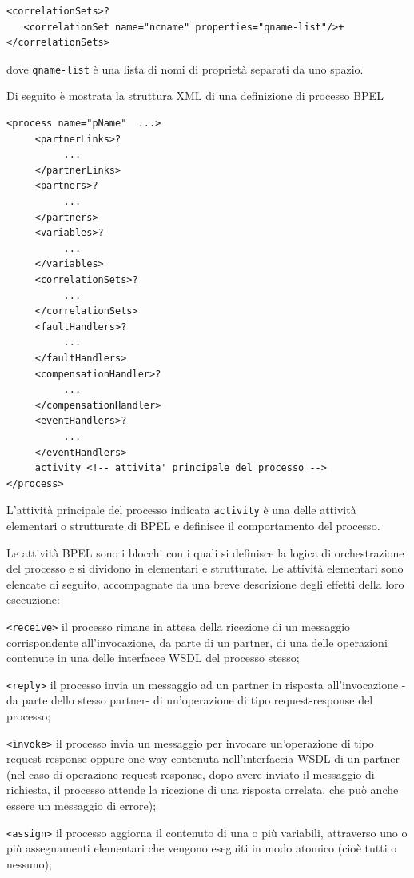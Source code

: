 \begin{verbatim}
<correlationSets>?
   <correlationSet name="ncname" properties="qname-list"/>+
</correlationSets>
\end{verbatim}

dove \texttt{qname-list} è una lista di nomi di proprietà separati da uno
spazio.

Di seguito è mostrata la struttura XML di una definizione di processo BPEL
\begin{verbatim}
<process name="pName"  ...>
     <partnerLinks>?
          ...
     </partnerLinks>
     <partners>?
          ...
     </partners>
     <variables>?
          ...
     </variables>
     <correlationSets>?
          ...
     </correlationSets>
     <faultHandlers>?
          ...
     </faultHandlers>
     <compensationHandler>?
          ...
     </compensationHandler>
     <eventHandlers>?
          ...
     </eventHandlers>
     activity <!-- attivita' principale del processo -->
</process>
\end{verbatim}
L'attività principale del processo indicata \texttt{activity} è una delle
attività elementari o strutturate di BPEL e definisce il comportamento del processo.

Le attività BPEL sono i blocchi con i quali si definisce la logica di
orchestrazione del processo e si dividono in elementari e strutturate. Le
attività elementari sono elencate di seguito, accompagnate da una breve
descrizione degli effetti della loro esecuzione:

\texttt{<receive>} il processo rimane in attesa della ricezione di un messaggio
     corrispondente all'invocazione, da parte di un partner, di una delle
     operazioni contenute in una delle interfacce WSDL del processo stesso;

\texttt{<reply>} il processo invia un messaggio ad un partner in risposta
all'invocazione -da parte dello stesso partner- di un'operazione di tipo
request-response del processo;

\texttt{<invoke>} il processo invia un messaggio per invocare un'operazione di
tipo request-response oppure one-way contenuta nell'interfaccia WSDL di
un partner (nel caso di operazione request-response, dopo avere inviato
il messaggio di richiesta, il processo attende la ricezione di una risposta
orrelata, che può anche essere un messaggio di errore);

\texttt{<assign>} il processo aggiorna il contenuto di una o più variabili,
attraverso uno o più assegnamenti elementari che vengono eseguiti in modo atomico (cioè
tutti o nessuno); 

